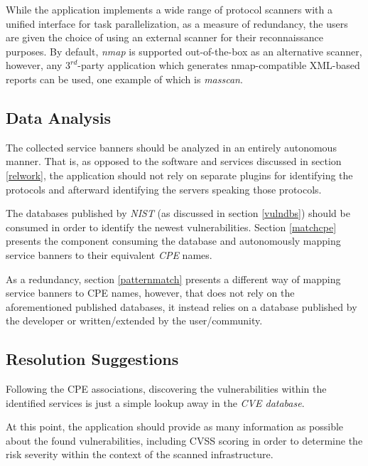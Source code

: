 \documentclass[a4paper,12pt]{article}
\begin{document}
	While the application implements a wide range of protocol scanners with a unified interface for task parallelization, as a measure of redundancy, the users are given the choice of using an external scanner for their reconnaissance purposes. By default, \textit{nmap} is supported out-of-the-box as an alternative scanner, however, any $3^{rd}$-party application which generates nmap-compatible XML-based reports can be used, one example of which is \textit{masscan}.
		
\subsection{Data Analysis}
 
	
	The collected service banners should be analyzed in an entirely autonomous manner. That is, as opposed to the software and services discussed in section \ref{relwork}, the application should not rely on separate plugins for identifying the protocols and afterward identifying the servers speaking those protocols.
	
	The databases published by \textit{NIST} (as discussed in section \ref{vulndbs}) should be consumed in order to identify the newest vulnerabilities. Section \ref{matchcpe} presents the component consuming the database and autonomously mapping service banners to their equivalent \textit{CPE} names.
	
	As a redundancy, section \ref{patternmatch} presents a different way of mapping service banners to CPE names, however, that does not rely on the aforementioned published databases, it instead relies on a database published by the developer or written/extended by the user/community.
			
\subsection{Resolution Suggestions}
 
	
	Following the CPE associations, discovering the vulnerabilities within the identified services is just a simple lookup away in the \textit{CVE database}.
	
	At this point, the application should provide as many information as possible about the found vulnerabilities, including CVSS scoring in order to determine the risk severity within the context of the scanned infrastructure.
	
\end{document}
